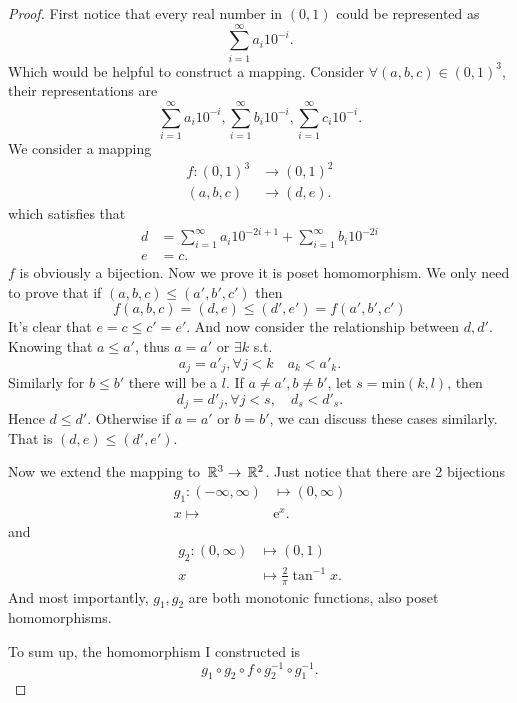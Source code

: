 \begin{proof}
		First notice that every real number in $(0,1)$ could be represented as 
	\[
	\sum_{i=1}^{\infty} a_i 10^{-i}
	.\] 
	Which would be helpful to construct a mapping. Consider $\forall \left( a,b,c \right) \in (0,1)^{3}  $, their representations
	are 
	\[
			\sum_{i=1}^{\infty} a_i 10^{-i}, \sum_{i=1}^{\infty} b_i 10^{-i},
	\sum_{i=1}^{\infty} c_i 10^{-i}
	.\] 
	We consider a mapping 
	\begin{align*}
			f: (0,1)^{3} &\to (0,1)^{2}  \\
			\left( a,b,c \right) &\to \left( d,e \right) 
	.\end{align*}
	which satisfies that
	\begin{align*}
			d &= \sum_{i=1}^{\infty} a_i 10^{-2i+1} + \sum_{i=1}^{\infty} b_i 10^{-2i} \\
			e &= c
	.\end{align*}
	$f$ is obviously a bijection. Now we prove it is poset homomorphism. 
	We only need to prove that if $\left( a,b,c \right) \le \left( a',b',c' \right) $ then 
	\[ f\left( a,b,c \right)  = \left( d,e \right) \le  \left( d',e' \right) = f\left( a',b',c' \right) \]
	It's clear that $e=c\le c' = e'$. And now consider the relationship between $d,d'$.
	Knowing that  $a\le a'$, thus $a=a'$ or $\exists k$ s.t. 
	\[
	a_j = a'_j, \forall j < k \quad a_k <  a'_k
	.\] 
	Similarly for $b\le b'$ there will be a $l$. 
	If $a\neq a',b\neq b'$, let $s = \mathrm{min}\left( k,l \right) $, then 
	\[
	d_j = d'_j, \forall j < s, \quad d_s < d'_s
	.\] 
	Hence $d\le d'$. 
	Otherwise if $a=a'$ or  $b=b'$, we can discuss these cases similarly.
	That is $\left( d,e \right) \le \left( d',e' \right) $.

	Now we extend the mapping to $\,\mathbb{R}^{3}\to \,\mathbb{R}^{2}$. Just notice that there are 2 bijections
	\begin{align*}
			g_1: \left( -\infty,\infty \right) &\mapsto  (0,\infty)\\
			x\mapsto &\mathrm{e} ^{x} 
	.\end{align*}
	and 
	\begin{align*}
			g_2: \left( 0,\infty \right) &\mapsto (0,1)   \\
			x &\mapsto \frac{2}{\pi} \tan^{-1} x
	.\end{align*}
	And most importantly, $g_1,g_2$ are both monotonic functions, also poset homomorphisms.

	To sum up, the homomorphism I constructed is 
	\[
	g_1 \circ g_2 \circ f \circ g_2^{-1} \circ g_1 ^{-1}
	.\] 
\end{proof}

